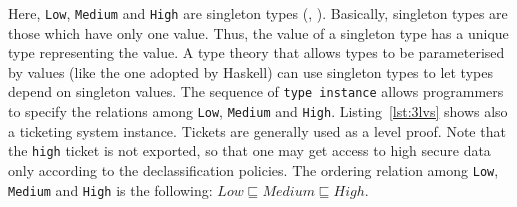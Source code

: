 Here, \texttt{Low}, \texttt{Medium} and \texttt{High} are singleton types (\cite{stone2000singleton}, \cite{pierce2005advanced}). Basically, singleton types are those which have only one value. Thus, the value of a singleton type has a unique type representing the value. A type theory that allows types to be parameterised by values (like the one adopted by Haskell) can use singleton types to let types depend on singleton values. The sequence of \texttt{type instance} allows programmers to specify the relations among \texttt{Low}, \texttt{Medium} and \texttt{High}. Listing~\ref{lst:3lvs} shows also a ticketing system instance. Tickets are generally used as a level proof. Note that the \texttt{high} ticket is not exported, so that one may get access to high secure data only according to the declassification policies. The ordering relation among \texttt{Low}, \texttt{Medium} and \texttt{High} is the following: $Low \sqsubseteq Medium \sqsubseteq High$.


